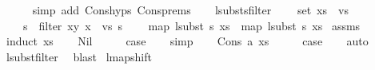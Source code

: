 \begin{isabellebody}
\ \ \ \ \isamarkupfalse%
\ {\isacharparenleft}{\kern0pt}simp\ add{\isacharcolon}{\kern0pt}\ Cons{\isachardot}{\kern0pt}hyps\ Cons{\isachardot}{\kern0pt}prems{\isacharparenleft}{\kern0pt}{}{\isacharcomma}{\kern0pt}{}{\isacharparenright}{\kern0pt}{\isacharparenright}{\kern0pt}\isanewline
\ \ \isamarkupfalse%
\isanewline
{}\isamarkupfalse%
%
\endisatagproof
{\isafoldproof}%
%
\isadelimproof
\isanewline
%
\endisadelimproof
\isanewline
\isanewline
{}\isamarkupfalse%
\ lsubsts{\isacharunderscore}{\kern0pt}filter{\isacharcolon}{\kern0pt}\isanewline
\ \ \ \ {\isachardoublequoteopen}set\ xs\ {\isasymsubseteq}\ vs{\isachardoublequoteclose}\isanewline
\ \ \ \ {\isachardoublequoteopen}s{}\ {\isacharequal}{\kern0pt}\ filter\ {\isacharparenleft}{\kern0pt}{\isasymlambda}{\isacharparenleft}{\kern0pt}x{\isacharcomma}{\kern0pt}y{\isacharparenright}{\kern0pt}{\isachardot}{\kern0pt}\ x\ {\isasymin}\ vs{\isacharparenright}{\kern0pt}\ s{\isachardoublequoteclose}\isanewline
\ \ \ \ {\isachardoublequoteopen}map\ {\isacharparenleft}{\kern0pt}lsubst\ s{\isacharparenright}{\kern0pt}\ xs\ {\isacharequal}{\kern0pt}\ map\ {\isacharparenleft}{\kern0pt}lsubst\ s{}{\isacharparenright}{\kern0pt}\ xs{\isachardoublequoteclose}\isanewline
%
\isadelimproof
%
\endisadelimproof
%
\isatagproof
{}\isamarkupfalse%
\ assms\isanewline
{}\isamarkupfalse%
\ {\isacharparenleft}{\kern0pt}induct\ xs{\isacharparenright}{\kern0pt}\isanewline
\ \ \isamarkupfalse%
\ Nil\isanewline
\ \ \isamarkupfalse%
\ \isamarkupfalse%
\ {\isacharquery}{\kern0pt}case\isanewline
\ \ \isamarkupfalse%
\ simp\isanewline
{}\isamarkupfalse%
\isanewline
\ \ \isamarkupfalse%
\ {\isacharparenleft}{\kern0pt}Cons\ a\ xs{\isacharparenright}{\kern0pt}\isanewline
\ \ \isamarkupfalse%
\ \isamarkupfalse%
\ {\isacharquery}{\kern0pt}case\isanewline
\ \ \isamarkupfalse%
\ auto\isanewline
\ \ \isamarkupfalse%
\ lsubst{\isacharunderscore}{\kern0pt}filter\ \isamarkupfalse%
\ blast\isanewline
{}\isamarkupfalse%
%
\endisatagproof
{\isafoldproof}%
%
\isadelimproof
\isanewline
%
\endisadelimproof
\isanewline
\isanewline
{}\isamarkupfalse%
\ lmap{\isacharunderscore}{\kern0pt}shift{\isacharcolon}{\kern0pt}\isanewline

\end{isabellebody}
